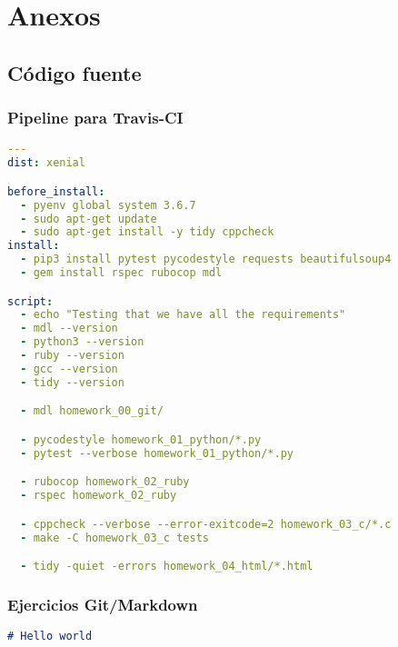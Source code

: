 \chapter{Anexos}

\section{Código fuente}

\subsection{Pipeline para Travis-CI}

\begin{lstlisting}[language=yaml,caption={.travis.yml},captionpos=b]
---
dist: xenial

before_install:
  - pyenv global system 3.6.7
  - sudo apt-get update
  - sudo apt-get install -y tidy cppcheck
install:
  - pip3 install pytest pycodestyle requests beautifulsoup4
  - gem install rspec rubocop mdl

script:
  - echo "Testing that we have all the requirements"
  - mdl --version
  - python3 --version
  - ruby --version
  - gcc --version
  - tidy --version

  - mdl homework_00_git/

  - pycodestyle homework_01_python/*.py
  - pytest --verbose homework_01_python/*.py

  - rubocop homework_02_ruby
  - rspec homework_02_ruby

  - cppcheck --verbose --error-exitcode=2 homework_03_c/*.c
  - make -C homework_03_c tests

  - tidy -quiet -errors homework_04_html/*.html
\end{lstlisting}

\subsection{Ejercicios Git/Markdown}
\begin{lstlisting}[language=markdown,caption={exercise\_01.md},captionpos=b]
# Hello world
\end{lstlisting}

